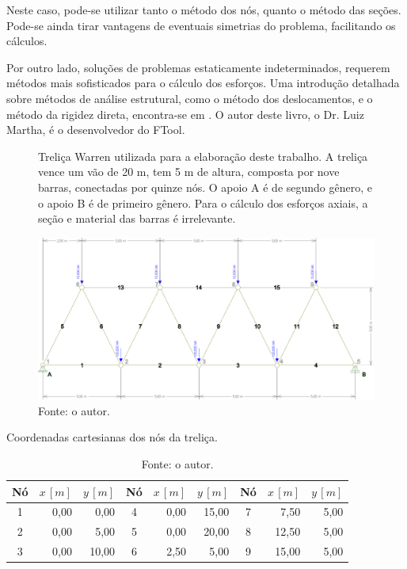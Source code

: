 \documentclass[a4paper, 12pt]{article} %
\begin{document}
Neste caso, pode-se utilizar tanto o método dos nós, quanto o método das seções. Pode-se ainda tirar vantagens de eventuais simetrias do problema, facilitando os cálculos. 

Por outro lado, soluções de problemas estaticamente indeterminados, requerem métodos mais sofisticados para o cálculo dos esforços. Uma introdução detalhada sobre métodos de análise estrutural, como o método dos deslocamentos, e o método da rigidez direta, encontra-se em \cite{martha}. O autor deste livro, o Dr. Luiz Martha, é o desenvolvedor do FTool. 
 
\begin{figure}[!ht]
    \centering
    \caption{Treliça Warren utilizada para a elaboração deste trabalho. A treliça vence um vão de 20 m, tem 5 m de altura, composta por nove barras, conectadas por quinze nós. O apoio A é de segundo gênero, e o apoio B é de primeiro gênero. Para o cálculo dos esforços axiais, a seção e material das barras é irrelevante.} 
    \includegraphics[width=\linewidth]{Warren-model.png}
    \caption*{Fonte: o autor.}
    \label{fig:warren-model}
\end{figure}

\begin{table}[t]
    \centering
    \caption{Coordenadas cartesianas dos nós da treliça.}
    \begin{tabular}{crr|crr|crr}
        \hline\hline
        Nó & $x\,[\unit{m}]$  & $y\,[\unit{m}]$ & Nó & $x\,[\unit{m}]$  & $y\,[\unit{m}]$ & Nó & $x\,[\unit{m}]$  & $y\,[\unit{m}]$ \\
        \hline\hline
        1 & 0,00 & 0,00 & 4 & 0,00 & 15,00 & 7 &  7,50 & 5,00 \\
        \hline
        2 & 0,00 & 5,00 & 5 & 0,00 & 20,00 & 8 & 12,50 & 5,00 \\
        \hline
        3 & 0,00 & 10,00 & 6 & 2,50 & 5,00 & 9 & 15,00 & 5,00 \\
        \hline\hline
    \end{tabular}
    \vspace{3mm}
    \caption*{Fonte: o autor.}
    \label{tab:coordenadas}
\end{table}
\end{document}
